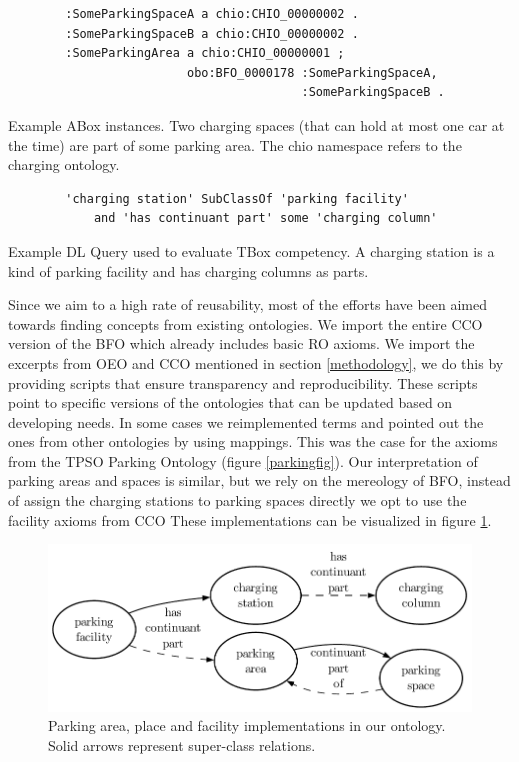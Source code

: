 \begin{listing}[h]
    \begin{verbatim}
        :SomeParkingSpaceA a chio:CHIO_00000002 .
        :SomeParkingSpaceB a chio:CHIO_00000002 .
        :SomeParkingArea a chio:CHIO_00000001 ;
                         obo:BFO_0000178 :SomeParkingSpaceA,
                                         :SomeParkingSpaceB .
    \end{verbatim}
    \caption{Example ABox instances. Two charging spaces (that can hold at most one car at the time) are part of some parking area. The chio namespace refers to the charging ontology.}
    \label{lst:2}
\end{listing}

\begin{listing}[h]
    \begin{verbatim}
        'charging station' SubClassOf 'parking facility' 
            and 'has continuant part' some 'charging column'
    \end{verbatim}
    \caption{Example DL Query used to evaluate TBox competency. A charging station is a kind of parking facility and has charging columns as parts.}
    \label{lst:3}
\end{listing}

Since we aim to a high rate of reusability, most of the efforts have been aimed
towards finding concepts from existing ontologies. We import the entire CCO
version of the BFO which already includes basic RO axioms. We import  the
excerpts from OEO and CCO mentioned in section \ref{methodology}, we do this by
providing scripts that ensure transparency and reproducibility. These scripts
point to specific versions of the ontologies that can be updated based on
developing needs. In some cases we reimplemented terms and pointed out the ones
from other ontologies by using mappings. This was the case for the axioms from
the TPSO Parking Ontology (figure \ref{parkingfig}). Our interpretation of
parking areas and spaces is similar, but we rely on the mereology of BFO,
instead of assign the charging stations to parking spaces directly we opt to use
the facility axioms from CCO These implementations can be visualized in figure
\ref{parkingchio}.

\begin{figure}[h]
    \centering
    \includegraphics{images/CHIOParking.pdf}
    \caption{Parking area, place and facility implementations in our ontology. Solid arrows represent super-class relations.}
    \label{parkingchio}
\end{figure}



    